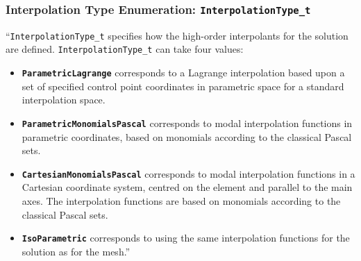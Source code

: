 \documentclass[11pt,letterpaper]{article}
\newenvironment{v2quote}
  {\begin{v2quoteframe}%
   \noindent{\footnotesize\sffamily\bfseries\color{cgnsblue}v2 text}%
   \nopagebreak\par\nopagebreak\vspace{0.15em}}
  {\end{v2quoteframe}}
\begin{document}
\subsubsection{Interpolation Type Enumeration: \texttt{InterpolationType\_t}}
\label{sec:interpolation-type}

\begin{v2quote}
``\texttt{InterpolationType\_t} specifies how the high-order interpolants for the solution are
defined.  \texttt{InterpolationType\_t} can take four values:

\begin{itemize}
  \item \textbf{\texttt{ParametricLagrange}} corresponds to a Lagrange interpolation based upon a
    set of specified control point coordinates in parametric space for a standard interpolation
    space.
  \item \textbf{\texttt{ParametricMonomialsPascal}} corresponds to modal interpolation functions
    in parametric coordinates, based on monomials according to the classical Pascal sets.
  \item \textbf{\texttt{CartesianMonomialsPascal}} corresponds to modal interpolation functions
    in a Cartesian coordinate system, centred on the element and parallel to the main axes.  The
    interpolation functions are based on monomials according to the classical Pascal sets.
  \item \textbf{\texttt{IsoParametric}} corresponds to using the same interpolation functions for
    the solution as for the mesh.''
\end{itemize}
\end{v2quote}
\end{document}
